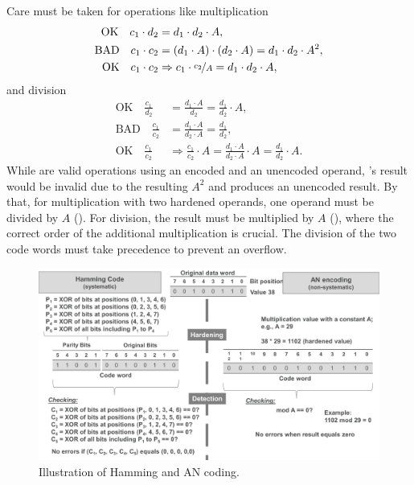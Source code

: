Care must be taken for operations like multiplication
\begin{subequations}
\begin{align}
	\text{OK} \quad c_1 \cdot d_2 &= d_1 \cdot d_2 \cdot A,
	\label{eq:ANMulUnenc}
	\\
	\text{BAD} \quad c_1 \cdot c_2 &= (d_1 \cdot A) \cdot (d_2 \cdot A) = d_1 \cdot d_2 \cdot A^2,
	\label{eq:ANMulBad}
	\\
	\text{OK} \quad c_1 \cdot c_2 &\Rightarrow c_1 \cdot \nicefrac{c_2}{A} = d_1 \cdot d_2 \cdot A,
	\label{eq:ANMulOK}
\end{align}
\end{subequations}
and division
\begin{subequations}
\begin{align}
	\text{OK} \quad \frac{c_1}{d_2} &= \frac{d_1 \cdot A}{d_2} = \frac{d_1}{d_2} \cdot A,
	\label{eq:ANDivUnenc}
	\\
	\text{BAD} \quad \frac{c_1}{c_2} &= \frac{d_1 \cdot A}{d_2 \cdot A} = \frac{d_1}{d_2},
	\label{eq:ANDivBad}
	\\
	\text{OK} \quad \frac{c_1}{c_2} &\Rightarrow \frac{c_1}{c_2} \cdot A = \frac{d_1 \cdot A}{d_2 \cdot A} \cdot A = \frac{d_1}{d_2} \cdot A.
	\label{eq:ANDivOK}
\end{align}
\end{subequations}
While  are valid operations using an encoded and an unencoded operand, 's result would be invalid due to the resulting \(A^2\) and  produces an unencoded result. By that, for multiplication with two hardened operands, one operand must be divided by \(A\) (). For division, the result must be multiplied by \(A\) (), where the correct order of the additional multiplication is crucial. The division of the two code words must take precedence to prevent an overflow.

\begin{figure}
	\centering
	\includegraphics[width=\linewidth]{figures/hamming-an-illustration.pdf}	
	\vspace{-0.5cm}
	\caption{Illustration of Hamming and AN coding.}%
	\label{fig:hamming-an-illustration}
	\vspace{-0.4cm}
\end{figure}


